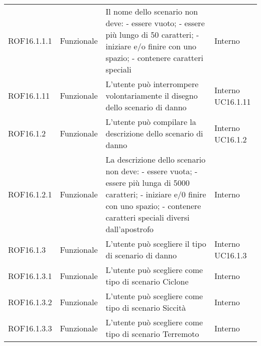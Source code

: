 \begin{longtable}{p{2cm}!{\VRule[1pt]}p{2cm}!{\VRule[1pt]}p{5cm}!{\VRule[1pt]}p{1.5cm}}
	\\
	ROF16.1.1.1&Funzionale\newline  & Il nome dello scenario non deve:
	- essere vuoto; 
	- essere più lungo di 50 caratteri; 
	- iniziare e/o finire con uno spazio;
	- contenere caratteri speciali & Interno \\
	ROF16.1.11                       & Funzionale\newline               & L'utente può interrompere volontariamente il disegno dello scenario di danno                                             & Interno \newline UC16.1.11   
	\\
	ROF16.1.2                        & Funzionale\newline               & L'utente può compilare la descrizione dello scenario di danno                                                            & Interno \newline UC16.1.2    
	\\
	ROF16.1.2.1&Funzionale\newline  & La descrizione dello scenario non deve:
	- essere vuota;
	- essere più lunga di 5000 caratteri;
	- iniziare e/0 finire con uno spazio; 
	- contenere caratteri speciali diversi dall'apostrofo & Interno \\
	ROF16.1.3                        & Funzionale\newline               & L'utente può scegliere il tipo di scenario di danno                                                                      & Interno \newline UC16.1.3    
	\\
	ROF16.1.3.1                      & Funzionale\newline               & L'utente può scegliere come tipo di scenario Ciclone                                                                     & Interno                      \\
	ROF16.1.3.2                      & Funzionale\newline               & L'utente può scegliere come tipo di scenario Siccità                                                                    & Interno                      \\
	ROF16.1.3.3                      & Funzionale\newline               & L'utente può scegliere come tipo di scenario Terremoto                                                                   & Interno                      \\

\end{longtable}
